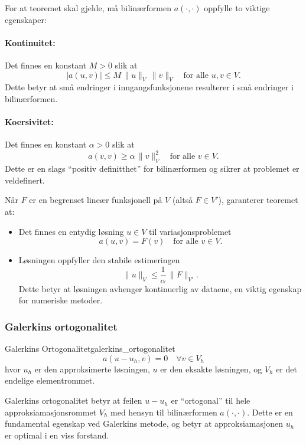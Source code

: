 \documentclass[../main.tex]{subfiles}
\begin{document}
For at teoremet skal gjelde, må bilinærformen $a(\cdot, \cdot)$ oppfylle to viktige egenskaper:

\paragraph{Kontinuitet:} Det finnes en konstant $M > 0$ slik at
\[
	|a(u,v)| \leq M\, \|u\|_V\, \|v\|_V \quad \text{for alle } u,v\in V.
\]
Dette betyr at små endringer i inngangsfunksjonene resulterer i små endringer i bilinærformen.

\paragraph{Koersivitet:} Det finnes en konstant $\alpha > 0$ slik at
\[
	a(v,v) \geq \alpha\, \|v\|_V^2 \quad \text{for alle } v\in V.
\]
Dette er en slags \enquote{positiv definitthet} for bilinærformen og sikrer at problemet er veldefinert.

Når $F$ er en begrenset lineær funksjonell på $V$ (altså $F \in V'$), garanterer teoremet at:
\begin{itemize}
	\item Det finnes en entydig løsning $u \in V$ til variasjonsproblemet
	      \[
		      a(u,v)=F(v) \quad \text{for alle } v\in V.
	      \]

	\item Løsningen oppfyller den stabile estimeringen
	      \[
		      \|u\|_V \leq \frac{1}{\alpha}\, \|F\|_{V'}.
	      \]
	      Dette betyr at løsningen avhenger kontinuerlig av dataene, en viktig egenskap for numeriske metoder.
\end{itemize}

\subsubsection{Galerkins ortogonalitet}

\begin{definition}{Galerkins Ortogonalitet}{galerkins_ortogonalitet}
	\[
		a(u - u_h, v) = 0 \quad \forall v \in V_h
	\]
	hvor $u_h$ er den approksimerte løsningen, $u$ er den eksakte løsningen, og $V_h$ er det endelige elementrommet.
\end{definition}

Galerkins ortogonalitet betyr at feilen $u - u_h$ er \enquote{ortogonal} til hele approksiamasjonsrommet $V_h$ med hensyn til bilinærformen $a(\cdot,\cdot)$. Dette er en fundamental egenskap ved Galerkins metode, og betyr at approksiamasjonen $u_h$ er optimal i en viss forstand.
\end{document}
